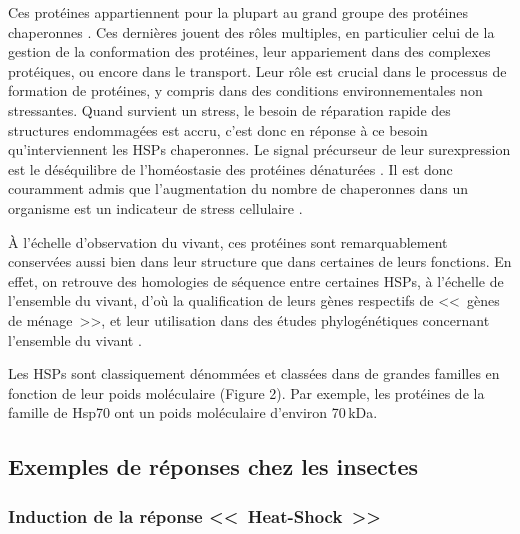 	Ces protéines appartiennent pour la plupart au grand groupe des protéines chaperonnes \cite{federhoffmann1999}.
	Ces dernières jouent des rôles multiples, en particulier celui de la gestion de la conformation des protéines, leur appariement dans des complexes protéiques, ou encore dans le transport.
	Leur rôle est crucial dans le processus de formation de protéines, y compris dans des conditions environnementales non stressantes.
	Quand survient un stress, le besoin de réparation rapide des structures endommagées est accru, c'est donc en réponse à ce besoin qu'interviennent les HSPs chaperonnes.
	Le signal précurseur de leur surexpression est le déséquilibre de l'homéostasie des protéines dénaturées \cite{ananthan1986}.
	Il est donc couramment admis que l'augmentation du nombre de chaperonnes dans un organisme est un indicateur de stress cellulaire \cite{ryan1996}.

	À l'échelle d'observation du vivant, ces protéines sont remarquablement conservées aussi bien dans leur structure que dans certaines de leurs fonctions.
	En effet, on retrouve des homologies de séquence entre certaines HSPs, à l'échelle de l'ensemble du vivant, d'où la qualification de leurs gènes respectifs de <<~gènes de ménage~>>, et leur utilisation dans des études phylogénétiques concernant l'ensemble du vivant \cite{gupta1995}.

	Les HSPs sont classiquement dénommées et classées dans de grandes familles en fonction de leur poids moléculaire (Figure 2).
	Par exemple, les protéines de la famille de Hsp70 ont un poids moléculaire d'environ 70\,kDa.


	\subsection{Exemples de réponses chez les insectes}

		\subsubsection{Induction de la réponse <<~Heat-Shock~>>}
